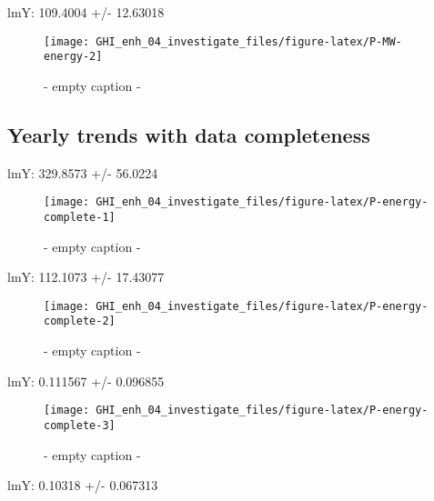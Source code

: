 \documentclass[
  10pt,
  a4paper,oneside]{article}
\begin{document}
lmY: 109.4004 +/- 12.63018

\begin{figure}[H]

{\centering \texttt{[image: GHI\_enh\_04\_investigate\_files/figure-latex/P-MW-energy-2]} 

}

\caption{ - empty caption - }\label{fig:P-MW-energy-2}
\end{figure}

\newpage

\hypertarget{yearly-trends-with-data-completeness}{%
\subsection{Yearly trends with data completeness}\label{yearly-trends-with-data-completeness}}

lmY: 329.8573 +/- 56.0224

\begin{figure}[H]

{\centering \texttt{[image: GHI\_enh\_04\_investigate\_files/figure-latex/P-energy-complete-1]} 

}

\caption{ - empty caption - }\label{fig:P-energy-complete-1}
\end{figure}

lmY: 112.1073 +/- 17.43077

\begin{figure}[H]

{\centering \texttt{[image: GHI\_enh\_04\_investigate\_files/figure-latex/P-energy-complete-2]} 

}

\caption{ - empty caption - }\label{fig:P-energy-complete-2}
\end{figure}

lmY: 0.111567 +/- 0.096855

\begin{figure}[H]

{\centering \texttt{[image: GHI\_enh\_04\_investigate\_files/figure-latex/P-energy-complete-3]} 

}

\caption{ - empty caption - }\label{fig:P-energy-complete-3}
\end{figure}

lmY: 0.10318 +/- 0.067313
\end{document}
